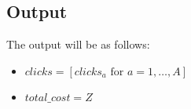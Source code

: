 \documentclass{article}
\begin{document}
\subsection*{Output}
The output will be as follows:
\begin{itemize}
    \item $clicks = [clicks_a \text{ for } a = 1, \ldots, A]$
    \item $total\_cost = Z$
\end{itemize}
\end{document}

